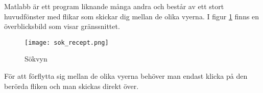 Matlabb är ett program liknande många andra och består av ett stort
huvudfönster med flikar som skickar dig mellan de olika vyerna. I
figur \ref{fig:oversikt} finns en överblicksbild som visar gränssnittet.

\begin{figure}[h]
        \centering 
        \texttt{[image: sok\_recept.png]} 
        \caption{Sökvyn} 
        \label{fig:oversikt}
\end{figure}

För att förflytta sig mellan de olika vyerna behöver man endast klicka
på den berörda fliken och man skickas direkt över.


